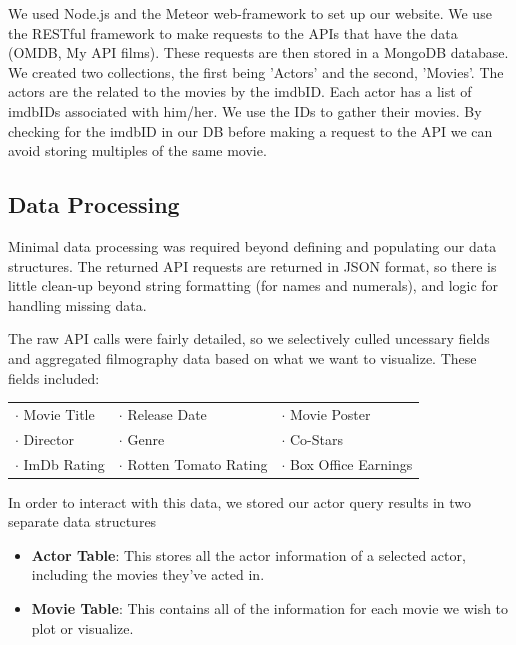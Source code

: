 \documentclass[12pt]{article}
\begin{document}

	We used Node.js and the Meteor web-framework to set up our website. We use the RESTful framework to make requests to the APIs that have the data (OMDB, My API films). These requests are then stored in a MongoDB database. We created two collections, the first being 'Actors' and the second, 'Movies'. The actors are the related to the movies by the imdbID. Each actor has a list of imdbIDs associated with him/her. We use the IDs to gather their movies. By checking for the imdbID in our DB before making a request to the API we can avoid storing multiples of the same movie.


	
\subsection{Data Processing}
	Minimal data processing was required beyond defining and populating our data structures.  The returned API requests are returned in JSON format, so there is little clean-up beyond string formatting (for names and numerals), and logic for handling missing data.  
	
	The raw API calls were fairly detailed, so we selectively culled uncessary fields and aggregated filmography data based on what we want to visualize. These fields included:
	
	\begin{center}
	\begin{tabular}{lll}
	$\cdot$ Movie Title & $\cdot$ Release Date & $\cdot$ Movie Poster\\
	$\cdot$ Director  & $\cdot$ Genre & $\cdot$ Co-Stars\\
	$\cdot$ ImDb Rating & $\cdot$ Rotten Tomato Rating & $\cdot$ Box Office Earnings\\
	\end{tabular}
	\end{center}
	
	In order to interact with this data, we stored our actor query results in two separate data structures
	\begin{itemize}
		\item \textbf{Actor Table}: This stores all the actor information of a selected actor, including the movies they've acted in.
		\item \textbf{Movie Table}: This contains all of the information for each movie we wish to plot or visualize.
	\end{itemize}
\end{document}
